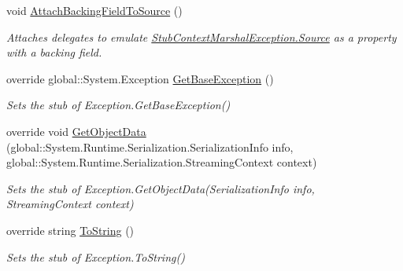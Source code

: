 \begin{DoxyCompactItemize}
void \hyperlink{class_system_1_1_fakes_1_1_stub_context_marshal_exception_ab34a7d6253dcb78394f437d59063acaf}{Attach\-Backing\-Field\-To\-Source} ()
\begin{DoxyCompactList}\small\item\em Attaches delegates to emulate \hyperlink{class_system_1_1_fakes_1_1_stub_context_marshal_exception_abd7b6c24a73445a0f6d80e73e4c3e059}{Stub\-Context\-Marshal\-Exception.\-Source} as a property with a backing field.\end{DoxyCompactList}\item 
override global\-::\-System.\-Exception \hyperlink{class_system_1_1_fakes_1_1_stub_context_marshal_exception_ad14ca866bb1a95178063f5dd65ee7016}{Get\-Base\-Exception} ()
\begin{DoxyCompactList}\small\item\em Sets the stub of Exception.\-Get\-Base\-Exception()\end{DoxyCompactList}\item 
override void \hyperlink{class_system_1_1_fakes_1_1_stub_context_marshal_exception_a21ce419b8b3a67434d48d2ea463e77e6}{Get\-Object\-Data} (global\-::\-System.\-Runtime.\-Serialization.\-Serialization\-Info info, global\-::\-System.\-Runtime.\-Serialization.\-Streaming\-Context context)
\begin{DoxyCompactList}\small\item\em Sets the stub of Exception.\-Get\-Object\-Data(\-Serialization\-Info info, Streaming\-Context context)\end{DoxyCompactList}\item 
override string \hyperlink{class_system_1_1_fakes_1_1_stub_context_marshal_exception_a1a278dc7cb61a54f98750839c2786452}{To\-String} ()
\begin{DoxyCompactList}\small\item\em Sets the stub of Exception.\-To\-String()\end{DoxyCompactList}\end{DoxyCompactItemize}
